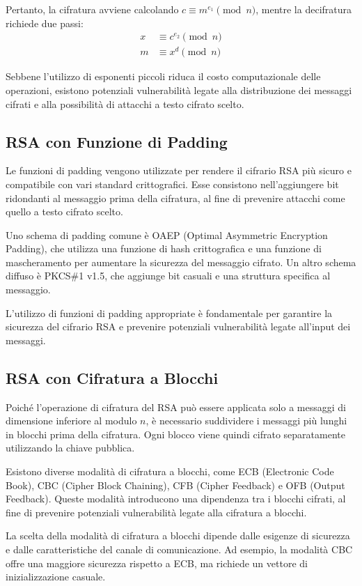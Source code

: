 \documentclass[a4paper,12pt]{report}
\begin{document}
Pertanto, la cifratura avviene calcolando $c \equiv m^{e_1} \pmod{n}$, mentre la decifratura richiede due passi:
\begin{align*}
x &\equiv c^{e_2} \pmod{n} \\
m &\equiv x^d \pmod{n}
\end{align*}

Sebbene l'utilizzo di esponenti piccoli riduca il costo computazionale delle operazioni, esistono potenziali vulnerabilità legate alla distribuzione dei messaggi cifrati e alla possibilità di attacchi a testo cifrato scelto.

\subsection{RSA con Funzione di Padding}
Le funzioni di padding vengono utilizzate per rendere il cifrario RSA più sicuro e compatibile con vari standard crittografici. Esse consistono nell'aggiungere bit ridondanti al messaggio prima della cifratura, al fine di prevenire attacchi come quello a testo cifrato scelto.

Uno schema di padding comune è OAEP (Optimal Asymmetric Encryption Padding), che utilizza una funzione di hash crittografica e una funzione di mascheramento per aumentare la sicurezza del messaggio cifrato. Un altro schema diffuso è PKCS\#1 v1.5, che aggiunge bit casuali e una struttura specifica al messaggio.

L'utilizzo di funzioni di padding appropriate è fondamentale per garantire la sicurezza del cifrario RSA e prevenire potenziali vulnerabilità legate all'input dei messaggi.

\subsection{RSA con Cifratura a Blocchi}
Poiché l'operazione di cifratura del RSA può essere applicata solo a messaggi di dimensione inferiore al modulo $n$, è necessario suddividere i messaggi più lunghi in blocchi prima della cifratura. Ogni blocco viene quindi cifrato separatamente utilizzando la chiave pubblica.

Esistono diverse modalità di cifratura a blocchi, come ECB (Electronic Code Book), CBC (Cipher Block Chaining), CFB (Cipher Feedback) e OFB (Output Feedback). Queste modalità introducono una dipendenza tra i blocchi cifrati, al fine di prevenire potenziali vulnerabilità legate alla cifratura a blocchi.

La scelta della modalità di cifratura a blocchi dipende dalle esigenze di sicurezza e dalle caratteristiche del canale di comunicazione. Ad esempio, la modalità CBC offre una maggiore sicurezza rispetto a ECB, ma richiede un vettore di inizializzazione casuale.
\end{document}
